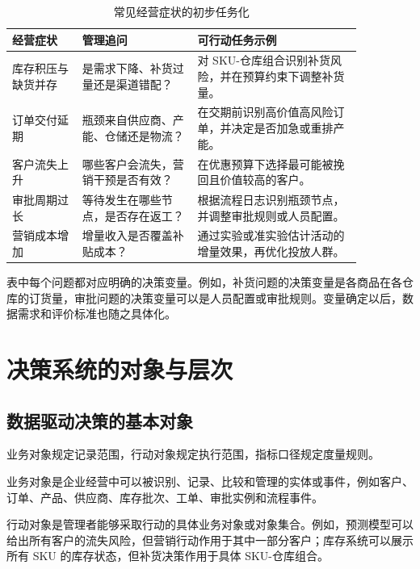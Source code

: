 \begin{table}[htbp]
\centering
\caption{常见经营症状的初步任务化}
\begin{tabular}{P{0.17\linewidth}P{0.29\linewidth}P{0.40\linewidth}}
\toprule
{}
经营症状 & 管理追问 & 可行动任务示例\\
\midrule
库存积压与缺货并存 & 是需求下降、补货过量还是渠道错配？ & 对 SKU-仓库组合识别补货风险，并在预算约束下调整补货量。\\
订单交付延期 & 瓶颈来自供应商、产能、仓储还是物流？ & 在交期前识别高价值高风险订单，并决定是否加急或重排产能。\\
客户流失上升 & 哪些客户会流失，营销干预是否有效？ & 在优惠预算下选择最可能被挽回且价值较高的客户。\\
审批周期过长 & 等待发生在哪些节点，是否存在返工？ & 根据流程日志识别瓶颈节点，并调整审批规则或人员配置。\\
营销成本增加 & 增量收入是否覆盖补贴成本？ & 通过实验或准实验估计活动的增量效果，再优化投放人群。\\
\bottomrule
\end{tabular}
\end{table}

表中每个问题都对应明确的决策变量。例如，补货问题的决策变量是各商品在各仓库的订货量，审批问题的决策变量可以是人员配置或审批规则。变量确定以后，数据需求和评价标准也随之具体化。

\section{决策系统的对象与层次}
\subsection{数据驱动决策的基本对象}

业务对象规定记录范围，行动对象规定执行范围，指标口径规定度量规则。

\begin{definition}[业务对象]
业务对象是企业经营中可以被识别、记录、比较和管理的实体或事件，例如客户、订单、产品、供应商、库存批次、工单、审批实例和流程事件。
\end{definition}

\begin{definition}[行动对象]
行动对象是管理者能够采取行动的具体业务对象或对象集合。例如，预测模型可以给出所有客户的流失风险，但营销行动作用于其中一部分客户；库存系统可以展示所有 SKU 的库存状态，但补货决策作用于具体 SKU-仓库组合。
\end{definition}

